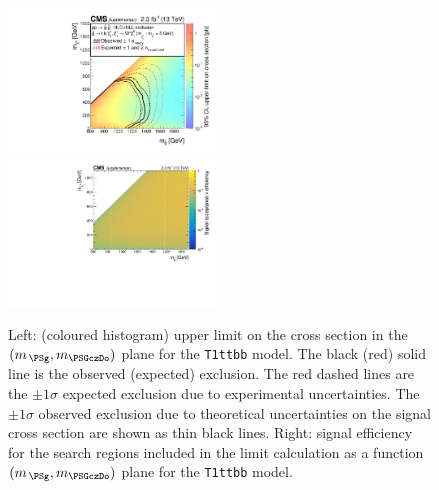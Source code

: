 \clearpage
\begin{figure}[!h]
  \begin{center}
    \includegraphics[width=0.49\textwidth]{Supplementary/RA1T1ttbbXSEC_aux} \, 
    \includegraphics[width=0.49\textwidth]{Supplementary/T1ttbb_merging_4_cats_aux} \,     
  \end{center}
  \caption{Left: (coloured histogram) upper limit on the cross section in the $(m_{\,\PSg}, m_{\PSGczDo})$ plane for the \texttt{T1ttbb} model. 
  The black (red) solid line is the observed (expected) exclusion. The red dashed lines are the $\pm1\sigma$ expected exclusion due to experimental uncertainties. 
  The $\pm1\sigma$ observed exclusion due to theoretical uncertainties on the signal cross section are shown as thin black lines. 
  Right: signal efficiency for the search regions included in the limit calculation as a function $(m_{\,\PSg}, m_{\PSGczDo})$ plane for the \texttt{T1ttbb} model. 
  \label{fig:T1ttbb_excl}}
\end{figure}

